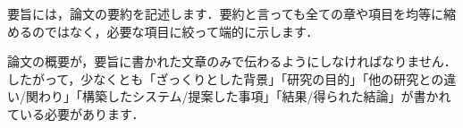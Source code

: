 要旨には，論文の要約を記述します．要約と言っても全ての章や項目を均等に縮めるのではなく，必要な項目に絞って端的に示します．

論文の概要が，要旨に書かれた文章のみで伝わるようにしなければなりません．
したがって，少なくとも「ざっくりとした背景」「研究の目的」「他の研究との違い/関わり」「構築したシステム/提案した事項」「結果/得られた結論」が書かれている必要があります．